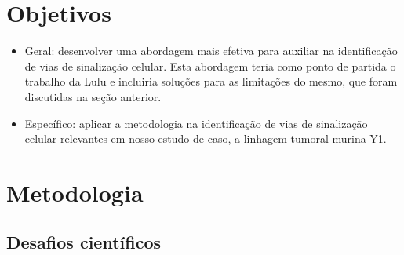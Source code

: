 \documentclass[12pt]{article}
\begin{document}



\section{Objetivos}

\begin{itemize}

\item \underline{Geral:} desenvolver uma abordagem mais efetiva para auxiliar na identificação de vias de sinalização celular. Esta abordagem teria como ponto de partida o trabalho da Lulu e incluiria soluções para as limitações do mesmo, que foram discutidas na seção anterior.

\item \underline{Específico:} aplicar a metodologia na identificação de vias de sinalização celular relevantes em nosso estudo de caso, a linhagem tumoral murina Y1.

\end{itemize}


\section{Metodologia}



\subsection{Desafios científicos}
\end{document}
